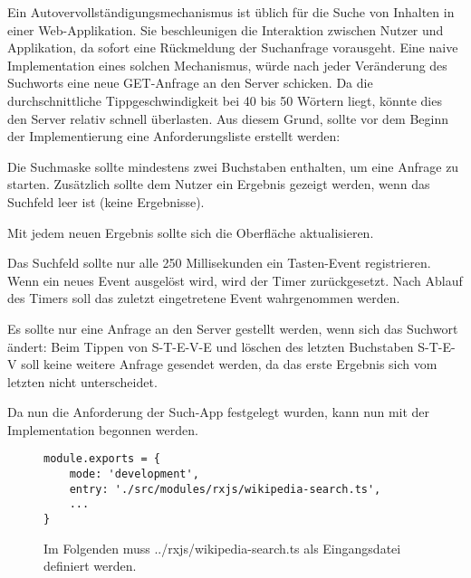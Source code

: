 Ein Autovervollständigungsmechanismus ist üblich für die Suche von Inhalten in einer Web-Applikation. Sie beschleunigen die Interaktion zwischen Nutzer und Applikation, da sofort eine Rückmeldung der Suchanfrage vorausgeht. Eine naive Implementation eines solchen Mechanismus, würde nach jeder Veränderung des Suchworts eine neue GET-Anfrage an den Server schicken. Da die durchschnittliche Tippgeschwindigkeit bei 40 bis 50 Wörtern liegt, könnte dies den Server relativ schnell überlasten. Aus diesem Grund, sollte vor dem Beginn der Implementierung eine Anforderungsliste erstellt werden:

\begin{description}
 \item Die Suchmaske sollte mindestens zwei Buchstaben enthalten, um eine Anfrage zu starten. Zusätzlich sollte dem Nutzer ein Ergebnis gezeigt werden, wenn das Suchfeld leer ist (keine Ergebnisse).
 \item Mit jedem neuen Ergebnis sollte sich die Oberfläche aktualisieren. 
 \item Das Suchfeld sollte nur alle 250 Millisekunden ein Tasten-Event registrieren. Wenn ein neues Event ausgelöst wird, wird der Timer zurückgesetzt. Nach Ablauf des Timers soll das zuletzt eingetretene Event wahrgenommen werden.
 \item Es sollte nur eine Anfrage an den Server gestellt werden, wenn sich das Suchwort ändert: Beim Tippen von \glqq S-T-E-V-E \grqq{} und löschen des letzten Buchstaben \glqq S-T-E-V\grqq{} soll keine weitere Anfrage gesendet werden, da das erste Ergebnis sich vom letzten nicht unterscheidet.
\end{description}

\noindent
Da nun die Anforderung der Such-App festgelegt wurden, kann nun mit der Implementation begonnen werden.

\begin{figure}[H]
\begin{lstlisting}[basicstyle=\small]
module.exports = {
    mode: 'development',
    entry: './src/modules/rxjs/wikipedia-search.ts',
    ...
}
\end{lstlisting}
\caption{Im Folgenden muss ../rxjs/wikipedia-search.ts als Eingangsdatei definiert werden.}
\end{figure}

